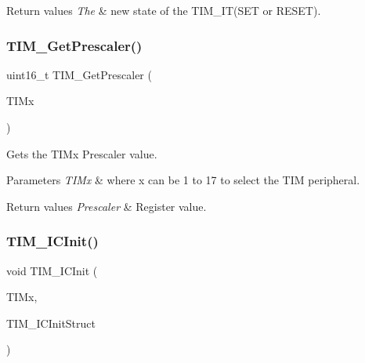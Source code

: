 \begin{DoxyRetVals}{Return values}
{\em The} & new state of the T\+I\+M\+\_\+\+I\+T(\+S\+E\+T or R\+E\+S\+E\+T). \\
\hline
\end{DoxyRetVals}
\mbox{\label{group___t_i_m___exported___functions_ga427eb6e533480e02a27cd0ca876183d6}} 
\subsubsection{\texorpdfstring{TIM\_GetPrescaler()}{TIM\_GetPrescaler()}}
{\footnotesize\ttfamily uint16\+\_\+t T\+I\+M\+\_\+\+Get\+Prescaler (\begin{DoxyParamCaption}\item[{\mbox{\hyperlink{struct_t_i_m___type_def}{T\+I\+M\+\_\+\+Type\+Def}} $\ast$}]{T\+I\+Mx }\end{DoxyParamCaption})}



Gets the T\+I\+Mx Prescaler value. 


\begin{DoxyParams}{Parameters}
{\em T\+I\+Mx} & where x can be 1 to 17 to select the T\+IM peripheral. \\
\hline
\end{DoxyParams}

\begin{DoxyRetVals}{Return values}
{\em Prescaler} & Register value. \\
\hline
\end{DoxyRetVals}
\mbox{\label{group___t_i_m___exported___functions_ga9e6a153dd6552e4e1188eba227316f7f}} 
\subsubsection{\texorpdfstring{TIM\_ICInit()}{TIM\_ICInit()}}
{\footnotesize\ttfamily void T\+I\+M\+\_\+\+I\+C\+Init (\begin{DoxyParamCaption}\item[{\mbox{\hyperlink{struct_t_i_m___type_def}{T\+I\+M\+\_\+\+Type\+Def}} $\ast$}]{T\+I\+Mx,  }\item[{\mbox{\hyperlink{struct_t_i_m___i_c_init_type_def}{T\+I\+M\+\_\+\+I\+C\+Init\+Type\+Def}} $\ast$}]{T\+I\+M\+\_\+\+I\+C\+Init\+Struct }\end{DoxyParamCaption})}



